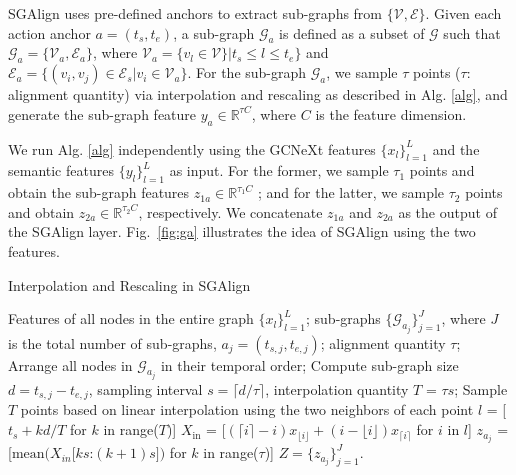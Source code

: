 \documentclass[10pt,twocolumn,letterpaper]{article}
\newcommand{\floor}[1]{\lfloor #1 \rfloor}
\newcommand{\ceil}[1]{\lceil #1 \rceil}
\begin{document}
SGAlign uses pre-defined anchors to extract sub-graphs from $\{\mathcal{V}, \mathcal{E}\}$. Given each action anchor $a=(t_s,t_e)$, a sub-graph $\mathcal{G}_a$ is defined as a subset of $\mathcal{G}$ such that  $\mathcal{G}_a=\{\mathcal{V}_a,\mathcal{E}_a\}$, where $\mathcal{V}_a=\{v_l \in \mathcal{V}\} | {t_s\le l\le t_e}\} $ and $\mathcal{E}_a = \{(v_i, v_j) \in \mathcal{E}_s | v_i \in \mathcal{V}_a \}$.
For the sub-graph $\mathcal{G}_a$,  we sample  $\tau$ points ($\tau$: alignment quantity) via interpolation and rescaling as described in Alg. \ref{alg}, and generate the sub-graph feature  $y_a\in \mathbb{R}^{\tau C}$, where $C$ is the feature dimension.

We run Alg. \ref{alg} independently using the GCNeXt features $\{x_l\}_{l=1}^L$ and the semantic features $\{y_l\}_{l=1}^L$ as input. For the former, we sample $\tau_1$ points and obtain the sub-graph features $z_{1a}\in \mathbb{R}^{\tau_1 C}$ ; and for the latter, we sample  $\tau_2$ points and obtain $z_{2a}\in \mathbb{R}^{\tau_2 C}$, respectively. We concatenate $z_{1a}$ and $z_{2a}$ as the output of the SGAlign layer.  Fig.~\ref{fig:ga} illustrates the idea of SGAlign using the two features.





\begin{algorithm}[t]



\caption{ Interpolation and Rescaling in SGAlign }
\begin{algorithmic}[1]
\REQUIRE   Features of all nodes in the entire graph $\{x_l\}_{l=1}^L$; sub-graphs $\{\mathcal{G}_{a_j}\}_{j=1}^{J}$, where $J$ is the total number of sub-graphs, $a_j=(t_{s,j}, t_{e,j})$; alignment quantity $\tau$;
\STATE Arrange all nodes in $\mathcal{G}_{a_j}$ in their temporal order;
\STATE Compute sub-graph size $d=t_{s,j}-t_{e,j}$, sampling interval $s=\ceil{d/\tau}$,  interpolation quantity  $T$ = $\tau s$;
\STATE Sample $T$ points based on linear interpolation using the two neighbors of each point ${l}$ = [$t_s +  k d/ T $ for $k$ in range($T$)]
\STATE $X_{\textrm{in}}$ = [$(\ceil{i}-i) x_{\floor{i}}+(i-\floor{i}) x_{\ceil{i}}$ for $i$ in ${l}$]
\STATE $z_{a_j}$ = [$\textrm{mean}(X_{in}[k s$:$(k+1)s])$ for $k$ in range($\tau$)]
\ENDFOR
\ENSURE $Z = \{z_{a_j}\}_{j=1}^{J}$.
\end{algorithmic}


 \label{alg}
\end{algorithm}
\end{document}

